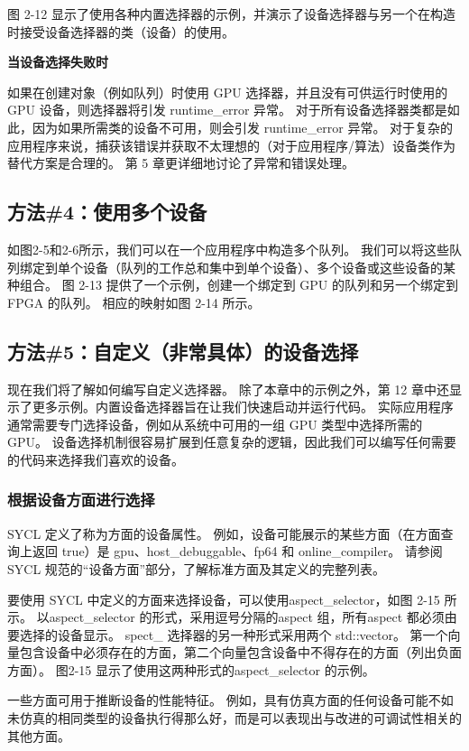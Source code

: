 图 2-12 显示了使用各种内置选择器的示例，并演示了设备选择器与另一个在构造时接受设备选择器的类（设备）的使用。

\textbf{当设备选择失败时}

如果在创建对象（例如队列）时使用 GPU 选择器，并且没有可供运行时使用的 GPU 设备，则选择器将引发 runtime\_error 异常。 对于所有设备选择器类都是如此，因为如果所需类的设备不可用，则会引发 runtime\_error 异常。 对于复杂的应用程序来说，捕获该错误并获取不太理想的（对于应用程序/算法）设备类作为替代方案是合理的。 第 5 章更详细地讨论了异常和错误处理。

\subsection{方法\#4：使用多个设备}
如图2-5和2-6所示，我们可以在一个应用程序中构造多个队列。 我们可以将这些队列绑定到单个设备（队列的工作总和集中到单个设备）、多个设备或这些设备的某种组合。 图 2-13 提供了一个示例，创建一个绑定到 GPU 的队列和另一个绑定到 FPGA 的队列。 相应的映射如图 2-14 所示。

\subsection{方法\#5：自定义（非常具体）的设备选择}
现在我们将了解如何编写自定义选择器。 除了本章中的示例之外，第 12 章中还显示了更多示例。内置设备选择器旨在让我们快速启动并运行代码。 实际应用程序通常需要专门选择设备，例如从系统中可用的一组 GPU 类型中选择所需的 GPU。 设备选择机制很容易扩展到任意复杂的逻辑，因此我们可以编写任何需要的代码来选择我们喜欢的设备。

\subsubsection{根据设备方面进行选择}
SYCL 定义了称为方面的设备属性。 例如，设备可能展示的某些方面（在方面查询上返回 true）是 gpu、host\_debuggable、fp64 和 online\_compiler。 请参阅 SYCL 规范的“设备方面”部分，了解标准方面及其定义的完整列表。

要使用 SYCL 中定义的方面来选择设备，可以使用aspect\_selector，如图 2-15 所示。 以aspect\_selector 的形式，采用逗号分隔的aspect 组，所有aspect 都必须由要选择的设备显示。 spect\_ 选择器的另一种形式采用两个 std::vector。 第一个向量包含设备中必须存在的方面，第二个向量包含设备中不得存在的方面（列出负面方面）。 图2-15 显示了使用这两种形式的aspect\_selector 的示例。

一些方面可用于推断设备的性能特征。 例如，具有仿真方面的任何设备可能不如未仿真的相同类型的设备执行得那么好，而是可以表现出与改进的可调试性相关的其他方面。


